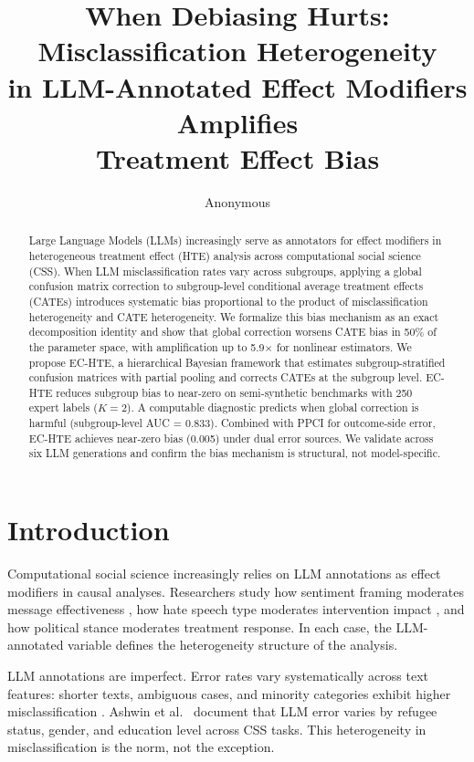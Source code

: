 \documentclass[11pt,twocolumn]{article}
\title{When Debiasing Hurts: Misclassification Heterogeneity\\in LLM-Annotated Effect Modifiers Amplifies\\Treatment Effect Bias}
\author{Anonymous}
\date{}
\begin{document}
\maketitle

\begin{abstract}
Large Language Models (LLMs) increasingly serve as annotators for effect modifiers in heterogeneous treatment effect (HTE) analysis across computational social science (CSS). When LLM misclassification rates vary across subgroups, applying a global confusion matrix correction to subgroup-level conditional average treatment effects (CATEs) introduces systematic bias proportional to the product of misclassification heterogeneity and CATE heterogeneity. We formalize this bias mechanism as an exact decomposition identity and show that global correction worsens CATE bias in 50\% of the parameter space, with amplification up to 5.9$\times$ for nonlinear estimators. We propose EC-HTE, a hierarchical Bayesian framework that estimates subgroup-stratified confusion matrices with partial pooling and corrects CATEs at the subgroup level. EC-HTE reduces subgroup bias to near-zero on semi-synthetic benchmarks with 250 expert labels ($K\!=\!2$). A computable diagnostic predicts when global correction is harmful (subgroup-level AUC = 0.833). Combined with PPCI for outcome-side error, EC-HTE achieves near-zero bias (0.005) under dual error sources. We validate across six LLM generations and confirm the bias mechanism is structural, not model-specific.
\end{abstract}

\section{Introduction}

Computational social science increasingly relies on LLM annotations as effect modifiers in causal analyses. Researchers study how sentiment framing moderates message effectiveness \cite{tornberg2024}, how hate speech type moderates intervention impact \cite{kennedy2020}, and how political stance moderates treatment response. In each case, the LLM-annotated variable defines the heterogeneity structure of the analysis.

LLM annotations are imperfect. Error rates vary systematically across text features: shorter texts, ambiguous cases, and minority categories exhibit higher misclassification \cite{gilardi2023,ziems2024}. Ashwin et al.\ \cite{ashwin2025} document that LLM error varies by refugee status, gender, and education level across CSS tasks. This heterogeneity in misclassification is the norm, not the exception.
\end{document}
